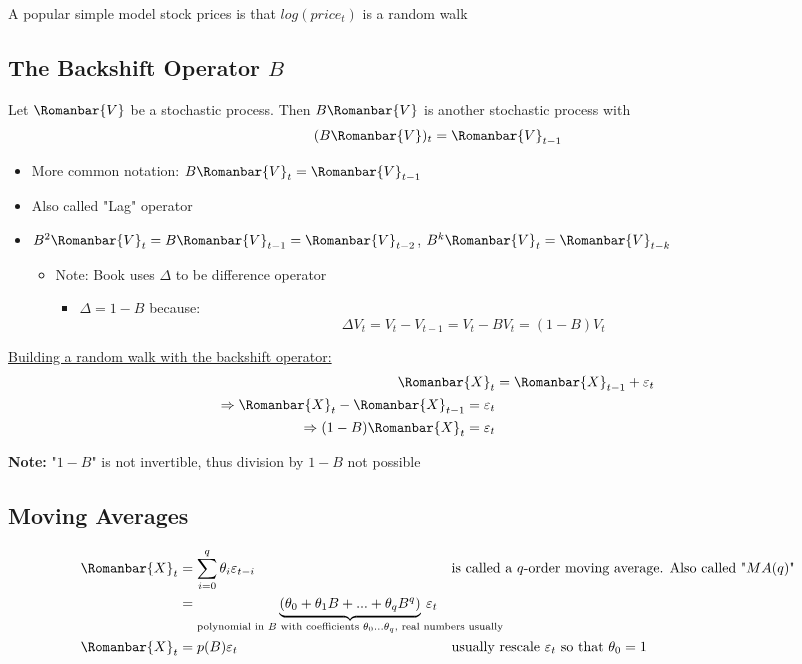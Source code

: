A popular simple model stock prices is that $log(price_t)$ is a random walk

\subsection{The Backshift Operator $B$}

Let $\Romanbar{V}$ be a stochastic process. Then $B\Romanbar{V}$ is another stochastic process with $$(B\Romanbar{V})_t=\Romanbar{V}_{t-1}$$

\begin{itemize}
    \item More common notation: $B\Romanbar{V}_t=\Romanbar{V}_{t-1}$
    \item Also called "Lag" operator 
    \item $B^2\Romanbar{V}_t=B\Romanbar{V}_{t-1}=\Romanbar{V}_{t-2}$, \quad $B^k\Romanbar{V}_t=\Romanbar{V}_{t-k}$
    \begin{itemize}
        \item[] Note: Book uses $\Delta$ to be difference operator 
        \begin{itemize}
            \item[] $\Delta=1-B$ because: 
            $$\Delta V_t = V_t-V_{t-1}=V_t-BV_t=(1-B)V_t$$
        \end{itemize}
    \end{itemize}
\end{itemize}

\underline{Building a random walk with the backshift operator:}
\bigskip
\begin{align*}
    \Romanbar{X}_t&=\Romanbar{X}_{t-1}+\varepsilon_t\\
    \Rightarrow \Romanbar{X}_t-\Romanbar{X}_{t-1}=\varepsilon_t\\
    \Rightarrow(1-B)\Romanbar{X}_t=\varepsilon_t
\end{align*}

\textbf{Note:} "$1-B$" is not invertible, thus division by $1-B$ not possible

\subsection{Moving Averages}

\begin{align*}
  \Romanbar{X}_t&=\sum_{i=0}^q \theta_i\varepsilon_{t-i} &&\text{is called a $q$-order moving average. Also called "$MA(q)$"} \\
  &= \underbrace{(\theta_0+\theta_1B+...+\theta_qB^q)}_{\text{polynomial in $B$ with coefficients $\theta_0...\theta_q$, real numbers usually}}\!\!\!\!\!\!\!\!\!\!\!\!\!\!\!\!\!\!\!\!\!\!\!\!\!\!\!\!\!\!\!\!\!\!\varepsilon_t \\
  \Romanbar{X}_t&=p(B)\varepsilon_t &&\text{usually rescale $\varepsilon_t$ so that $\theta_0=1$}
\end{align*}

